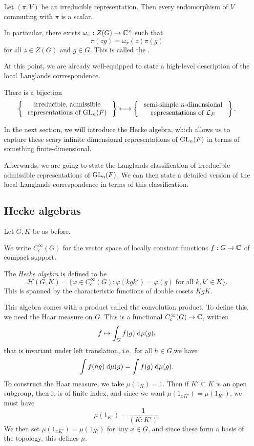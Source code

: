 \documentclass[a4paper]{article}
\begin{document}
\begin{lemma}
  Let $(\pi, V)$ be an irreducible representation. Then every endomorphism of $V$ commuting with $\pi$ is a scalar.

  In particular, there exists $\omega_\pi: Z(G) \to \mathbb{C}^\times$ such that
  \[
    \pi(zg) = \omega_\pi(z) \pi(g)
  \]
  for all $z \in Z(G)$ and $g \in G$. This is called the .\fakeqed
\end{lemma}

At this point, we are already well-equipped to state a high-level description of the local Langlands correspondence.
\begin{thm}
  There is a bijection
  \[
    \left\{\parbox{4.6cm}{\centering irreducible, admissible representations of $\GL_n(F)$}\right\} \longleftrightarrow \left\{\parbox{4.6cm}{\centering semi-simple $n$-dimensional representations of $\mathcal{L}_F$}\right\}.
  \]
\end{thm}

In the next section, we will introduce the Hecke algebra, which allows us to capture these scary infinite dimensional representations of $\mathrm{GL}_n(F)$ in terms of something finite-dimensional.

Afterwards, we are going to state the Langlands classification of irreducible admissible representations of $\mathrm{GL}_n(F)$. We can then state a detailed version of the local Langlands correspondence in terms of this classification.

\subsection{Hecke algebras}
Let $G, K$ be as before.
\begin{notation}
  We write $C_c^\infty(G)$ for the vector space of locally constant functions $f: G \to \mathbb{C}$ of compact support.
\end{notation}

\begin{defi}
  The \emph{Hecke algebra} is defined to be
  \[
    \mathcal{H}(G, K) = \{\varphi \in C_c^\infty(G) : \varphi(kgk') = \varphi(g)\text{ for all }k, k' \in K\}.
  \]
  This is spanned by the characteristic functions of double cosets $KgK$.
\end{defi}
This algebra comes with a product called the convolution product. To define this, we need the Haar measure on $G$. This is a functional $C_c^\infty(G) \to \mathbb{C}$, written
\[
  f \mapsto \int_G f(g) \;\mathrm{d} \mu (g),
\]
that is invariant under left translation, i.e.\ for all $h \in G$,we have
\[
  \int f(hg) \;\mathrm{d} \mu(g) = \int f(g)\;\mathrm{d} \mu(g).
\]
To construct the Haar measure, we take $\mu(1_K) = 1$. Then if $K' \subseteq K$ is an open subgroup, then it is of finite index, and since we want $\mu(1_{xK'}) = \mu(1_{K'})$, we must have
\[
  \mu(1_{K'}) = \frac{1}{(K:K')}.
\]
We then set $\mu(1_{xK'}) = \mu(1_{K'})$ for any $x \in G$, and since these form a basis of the topology, this defines $\mu$.
\end{document}
